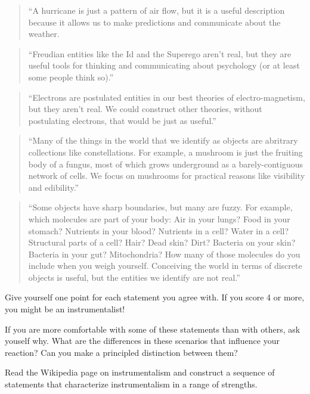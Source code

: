 \documentclass[10pt]{book}
\begin{document}
\begin{quote}
``A hurricane is just a pattern of air flow, but it is a useful
  description because it allows us to make predictions and communicate
  about the weather.
\end{quote}

\begin{quote}
``Freudian entities like the Id and the Superego aren't real, but they
  are useful tools for thinking and communicating about psychology (or
  at least some people think so).''
\end{quote}

\begin{quote}
``Electrons are postulated entities in our best theories of
electro-magnetism, but they aren't real.  We could construct
other theories, without postulating electrons, that would be
just as useful.''
\end{quote}

\begin{quote}
``Many of the things in the world that we identify as objects are
  abritrary collections like constellations.  For example, a mushroom
  is just the fruiting body of a fungus, most of which grows
  underground as a barely-contiguous network of cells.  We focus
  on mushrooms for practical reasons like visibility and edibility.''
\end{quote}

\begin{quote}
``Some objects have sharp boundaries, but many are fuzzy.  For
  example, which molecules are part of your body: Air in your lungs?
  Food in your stomach?  Nutrients in your blood?  Nutrients in a
  cell?  Water in a cell?  Structural parts of a cell?  Hair?  Dead
  skin?  Dirt?  Bacteria on your skin?  Bacteria in your gut?
  Mitochondria?  How many of those molecules do you include when you
  weigh yourself.  Conceiving the world in terms of discrete objects
  is useful, but the entities we identify are not real.''
\end{quote}

Give yourself one point for each statement you agree with.
If you score 4 or more, you might be an instrumentalist!

If you are more comfortable with some of these statements than with
others, ask youself why.  What are the differences in these
scenarios that influence your reaction?  Can you make
a principled distinction between them?

\begin{ex}

Read the Wikipedia page on instrumentalism and construct a sequence
of statements that characterize instrumentalism in a range of
strengths.

\end{ex}
\end{document}

